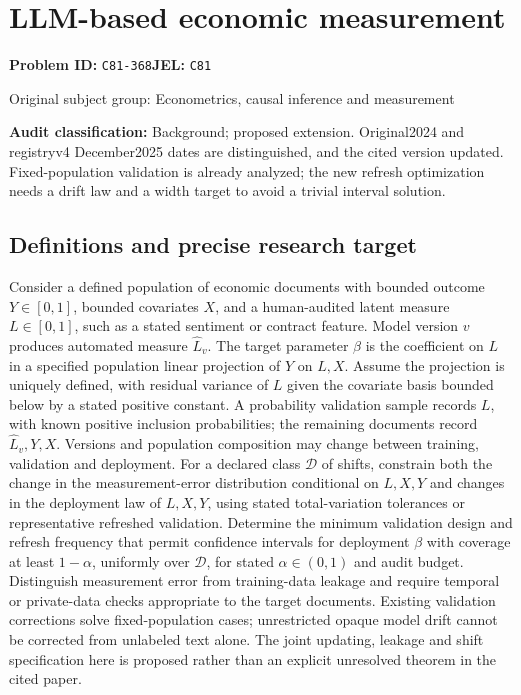 \documentclass[11pt,a4paper]{article}
\begin{document}
\section*{LLM-based economic measurement}
\textbf{Problem ID:} \texttt{C81-368}\quad \textbf{JEL:} \texttt{C81}\par
\label{problem:OP-0427}
{\sffamily\small\color{muted}Original subject group: Econometrics, causal inference and measurement\par}
\label{definitions:problem:30007709}
\textbf{Audit classification:} Background; proposed extension. Original2024 and registryv4 December2025 dates are distinguished, and the cited version updated. Fixed-population validation is already analyzed; the new refresh optimization needs a drift law and a width target to avoid a trivial interval solution.
\subsection*{Definitions and precise research target}
Consider a defined population of economic documents with bounded outcome \(Y\in[0,1]\), bounded covariates \(X\), and a human-audited latent measure \(L\in[0,1]\), such as a stated sentiment or contract feature. Model version \(v\) produces automated measure \(\widehat L_v\). The target parameter \(\beta\) is the coefficient on \(L\) in a specified population linear projection of \(Y\) on \(L,X\). Assume the projection is uniquely defined, with residual variance of \(L\) given the covariate basis bounded below by a stated positive constant. A probability validation sample records \(L\), with known positive inclusion probabilities; the remaining documents record \(\widehat L_v,Y,X\). Versions and population composition may change between training, validation and deployment. For a declared class \(\mathcal D\) of shifts, constrain both the change in the measurement-error distribution conditional on \(L,X,Y\) and changes in the deployment law of \(L,X,Y\), using stated total-variation tolerances or representative refreshed validation. Determine the minimum validation design and refresh frequency that permit confidence intervals for deployment \(\beta\) with coverage at least \(1-\alpha\), uniformly over \(\mathcal D\), for stated \(\alpha\in(0,1)\) and audit budget. Distinguish measurement error from training-data leakage and require temporal or private-data checks appropriate to the target documents. Existing validation corrections solve fixed-population cases; unrestricted opaque model drift cannot be corrected from unlabeled text alone. The joint updating, leakage and shift specification here is proposed rather than an explicit unresolved theorem in the cited paper.
\end{document}
